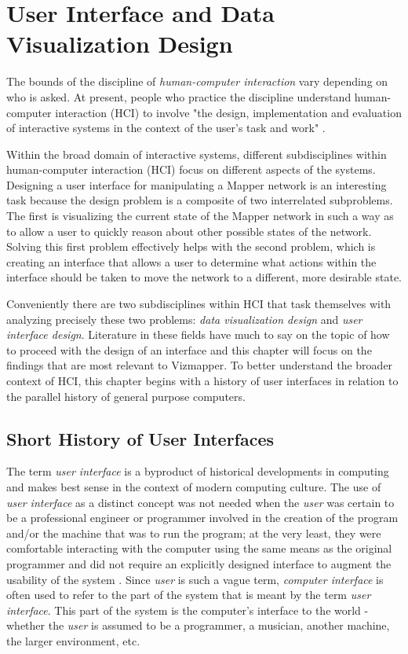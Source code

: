 \resetdatestamp

\chapter{User Interface and Data Visualization Design}

The bounds of the discipline of \emph{human-computer interaction} vary depending on who is asked. At present, people who practice the discipline understand human-computer interaction (HCI) to involve "the design, implementation and evaluation of interactive systems in the context of the user's task and work" \cite{hci1998}. 

Within the broad domain of interactive systems, different subdisciplines within human-computer interaction (HCI) focus on different aspects of the systems. Designing a user interface for manipulating a Mapper network is an interesting task because the design problem is a composite of two interrelated subproblems. The first is visualizing the current state of the Mapper network in such a way as to allow a user to quickly reason about other possible states of the network. Solving this first problem effectively helps with the second problem, which is creating an interface that allows a user to determine what actions within the interface should be taken to move the network to a different, more desirable state. 

Conveniently there are two subdisciplines within HCI that task themselves with analyzing precisely these two problems: \emph{data visualization design} and \emph{user interface design}. Literature in these fields have much to say on the topic of how to proceed with the design of an interface and this chapter will focus on the findings that are most relevant to Vizmapper. To better understand the broader context of HCI, this chapter begins with a history of user interfaces in relation to the parallel history of general purpose computers.

\section{Short History of User Interfaces}

The term \emph{user interface} is a byproduct of historical developments in computing and makes best sense in the context of modern computing culture. The use of \emph{user interface} as a distinct concept was not needed when the \emph{user} was certain to be a professional engineer or programmer involved in the creation of the program and/or the machine that was to run the program; at the very least, they were comfortable interacting with the computer using the same means as the original programmer and did not require an explicitly designed interface to augment the usability of the system \cite{continuity1990}. Since \emph{user} is such a vague term, \emph{computer interface} is often used to refer to the part of the system that is meant by the term \emph{user interface}. This part of the system is the computer's interface to the world - whether the \emph{user} is assumed to be a programmer, a musician, another machine, the larger environment, etc. 

